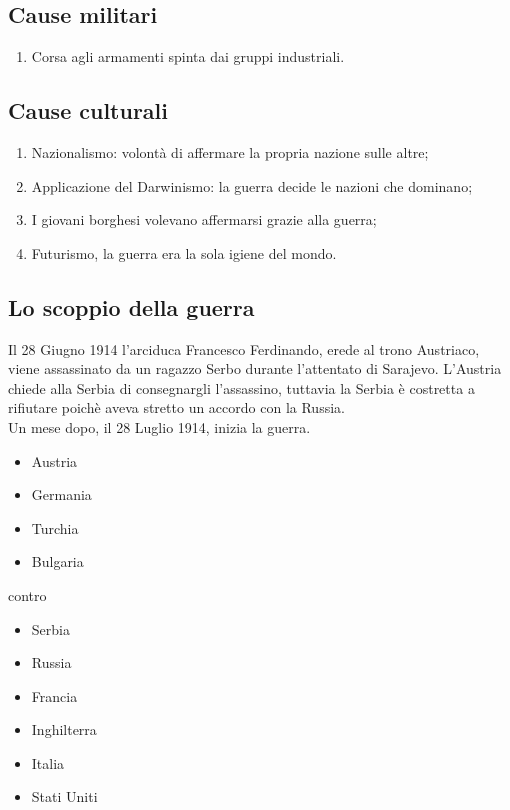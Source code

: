 \documentclass{article}
\begin{document}
\subsection{Cause militari}
\begin{enumerate}
    \item Corsa agli armamenti spinta dai gruppi industriali.
\end{enumerate}

\subsection{Cause culturali}
\begin{enumerate}
    \item Nazionalismo: volontà di affermare la propria nazione sulle altre;
    \item Applicazione del Darwinismo: la guerra decide le nazioni che dominano;
    \item I giovani borghesi volevano affermarsi grazie alla guerra;
    \item Futurismo, la guerra era la sola igiene del mondo.
\end{enumerate}

\subsection{Lo scoppio della guerra}

Il 28 Giugno 1914 l'arciduca Francesco Ferdinando, erede al trono Austriaco, viene assassinato da un ragazzo Serbo durante
l'attentato di Sarajevo.
L'Austria chiede alla Serbia di consegnargli l'assassino, tuttavia la Serbia è costretta a rifiutare poichè aveva
stretto un accordo con la Russia.\\
Un mese dopo, il 28 Luglio 1914, inizia la guerra.

\begin{itemize}
    \item Austria
    \item Germania
    \item Turchia
    \item Bulgaria
\end{itemize}

contro

\begin{itemize}
    \item Serbia
    \item Russia
    \item Francia
    \item Inghilterra
    \item Italia
    \item Stati Uniti
\end{itemize}
\end{document}
